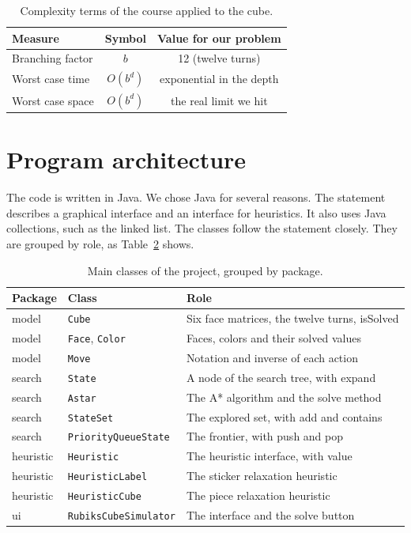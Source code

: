 \documentclass[11pt,a4paper]{article}
\begin{document}
\begin{table}[H]
\centering
\small
\begin{tabular}{lcc}
\toprule
Measure & Symbol & Value for our problem \\
\midrule
Branching factor & $b$ & 12 (twelve turns) \\
Worst case time  & $O(b^d)$ & exponential in the depth \\
Worst case space & $O(b^d)$ & the real limit we hit \\
\bottomrule
\end{tabular}
\caption{Complexity terms of the course applied to the cube.}
\label{tab:complexity}
\end{table}

\section{Program architecture}

The code is written in Java. We chose Java for several reasons. The statement
describes a graphical interface and an interface for heuristics. It also uses Java
collections, such as the linked list. The classes follow the statement closely.
They are grouped by role, as Table~\ref{tab:classes} shows.

\begin{table}[H]
\centering
\small
\begin{tabular}{lll}
\toprule
Package & Class & Role \\
\midrule
model     & \texttt{Cube}                 & Six face matrices, the twelve turns, isSolved \\
model     & \texttt{Face}, \texttt{Color} & Faces, colors and their solved values \\
model     & \texttt{Move}                 & Notation and inverse of each action \\
search    & \texttt{State}                & A node of the search tree, with expand \\
search    & \texttt{Astar}                & The A* algorithm and the solve method \\
search    & \texttt{StateSet}             & The explored set, with add and contains \\
search    & \texttt{PriorityQueueState}   & The frontier, with push and pop \\
heuristic & \texttt{Heuristic}            & The heuristic interface, with value \\
heuristic & \texttt{HeuristicLabel}       & The sticker relaxation heuristic \\
heuristic & \texttt{HeuristicCube}        & The piece relaxation heuristic \\
ui        & \texttt{RubiksCubeSimulator}  & The interface and the solve button \\
\bottomrule
\end{tabular}
\caption{Main classes of the project, grouped by package.}
\label{tab:classes}
\end{table}
\end{document}
